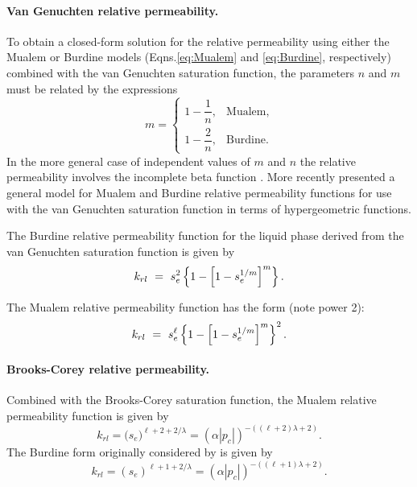 \paragraph{Van Genuchten relative permeability.}
To obtain a closed-form solution for the relative permeability using
either the Mualem or Burdine models (Eqns.\eqref{eq:Mualem} and
\eqref{eq:Burdine}, respectively) combined with the van Genuchten
saturation function, the parameters $n$ and $m$ must be related by the
expressions
\begin{equation}
\label{eq:lambda} 
m = \left\{
  \begin{array}{ll}
    1 - \dfrac{1}{n}, & \text{Mualem},\\[9pt]
    1 - \dfrac{2}{n}, & \text{Burdine}.
  \end{array}
\right.
\end{equation}
In the more general case of independent values of $m$ and $n$ the
relative permeability involves the incomplete beta function \citep{vangenuchten1985}. 
More recently \citep{douradoneto2011} presented a general model for Mualem and 
Burdine relative permeability functions for use with the van Genuchten saturation 
function in terms of hypergeometric functions.


The Burdine relative permeability function for the liquid phase derived
from the van Genuchten saturation function is given by
\begin{equation}
  k_{rl} \ =\  s_e^{2} \left\{ 1 - \left[ 1 - s_e^{1/m} \right]^m \right\}.
  \label{eq:krl_vGB} 
\end{equation}

The Mualem 
relative permeability function has the form (note power 2):
\begin{equation}
  k_{rl} \ =\  s_e^{\ell} \left\{ 1 - \left[ 1 - s_e^{1/m} \right]^m \right\}^2.
  \label{eq:krl_vGM} 
\end{equation}




\paragraph{Brooks-Corey relative permeability.}
Combined with the Brooks-Corey saturation function, the Mualem
relative permeability function is given by
\begin{equation} \label{eq:krl_BCM}
  k_{rl} = \big(s_e\big)^{\ell+2+2/\lambda} 
         = \left(\alpha |p_c|\right)^{-((\ell+2)\lambda+2)}.
\end{equation}
The Burdine form originally considered by \citet{brooks1964hydraulic}
is given by
\begin{equation} \label{eq:krl_BCB}
  k_{rl} = \left( s_e \right)^{ \ell+1+2/\lambda}
         = \left( \alpha |p_c| \right)^{-((\ell+1)\lambda+2)}.
\end{equation}


